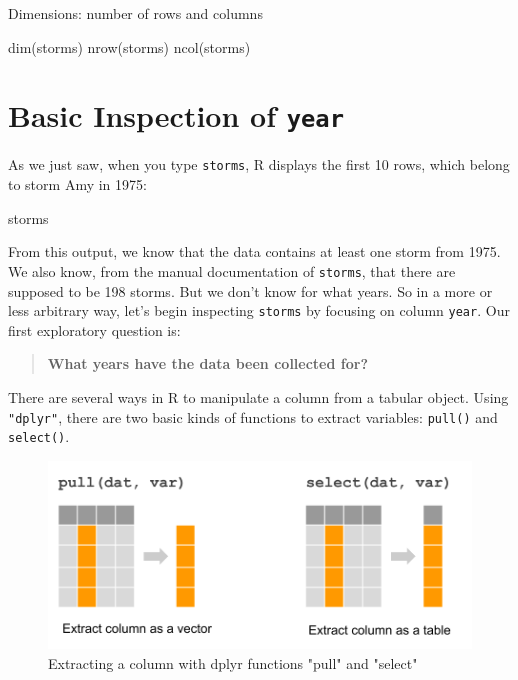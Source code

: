 \documentclass[
]{book}
\newenvironment{Shaded}{\begin{snugshade}}{\end{snugshade}}
\newcommand{\FunctionTok}[1]{\textcolor[rgb]{0.00,0.00,0.00}{#1}}
\newcommand{\NormalTok}[1]{#1}
\begin{document}
Dimensions: number of rows and columns

\begin{Shaded}
\begin{Highlighting}[]
\FunctionTok{dim}\NormalTok{(storms)}
\FunctionTok{nrow}\NormalTok{(storms)}
\FunctionTok{ncol}\NormalTok{(storms)}
\end{Highlighting}
\end{Shaded}

\hypertarget{basic-inspection-of-year}{%
\section{\texorpdfstring{Basic Inspection of \texttt{year}}{Basic Inspection of year}}\label{basic-inspection-of-year}}

As we just saw, when you type \texttt{storms}, R displays the first 10 rows, which
belong to storm Amy in 1975:

\begin{Shaded}
\begin{Highlighting}[]
\NormalTok{storms}
\end{Highlighting}
\end{Shaded}

From this output, we know that the data contains at least one storm from 1975.
We also know, from the manual documentation of \texttt{storms}, that there
are supposed to be 198 storms. But we don't know for what years. So in a more
or less arbitrary way, let's begin inspecting \texttt{storms} by focusing on column
\texttt{year}. Our first exploratory question is:

\begin{quote}
\textbf{What years have the data been collected for?}
\end{quote}

There are several ways in R to manipulate a column from a tabular object. Using
\texttt{"dplyr"}, there are two basic kinds of functions to extract variables:
\texttt{pull()} and \texttt{select()}.

\begin{figure}

{\centering \includegraphics[width=0.65\linewidth]{images/dplyr-extract-column} 

}

\caption{Extracting a column with dplyr functions "pull" and "select"}\label{fig:unnamed-chunk-9}
\end{figure}
\end{document}
